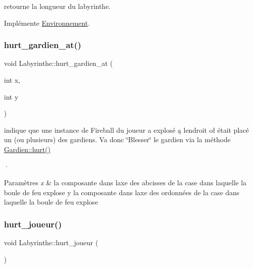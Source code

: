 retourne la longueur du labyrinthe. 



Implémente \hyperlink{classEnvironnement_af7629ab7f15ec65476eadcc80c46b50c}{Environnement}.

\mbox{\label{classLabyrinthe_a9c7c46b8c376f8b9ab0310ae1d0a369c}} 
\subsubsection{\texorpdfstring{hurt\+\_\+gardien\+\_\+at()}{hurt\_gardien\_at()}}
{\footnotesize\ttfamily void Labyrinthe\+::hurt\+\_\+gardien\+\_\+at (\begin{DoxyParamCaption}\item[{int}]{x,  }\item[{int}]{y }\end{DoxyParamCaption})}



indique que une instance de Fireball du joueur a explosé ą l\textquotesingle{}endroit oł était placé un (ou plusieurs) des gardiens. Va donc \char`\"{}\+Blesser\char`\"{} le gardien via la méthode \hyperlink{classGardien_ac4ba490e309de80c1449fc5baef90390}{Gardien\+::hurt()} 

·
\begin{DoxyParams}{Paramètres}
{\em x} & la composante dans l\textquotesingle{}axe des abcisses de la case dans laquelle la boule de feu explose  y la composante dans l\textquotesingle{}axe des ordonnées de la case dans laquelle la boule de feu explose \\
\hline
\end{DoxyParams}
\mbox{\label{classLabyrinthe_a28666f6cd5a5f32d41d664204a717593}} 
\subsubsection{\texorpdfstring{hurt\+\_\+joueur()}{hurt\_joueur()}}
{\footnotesize\ttfamily void Labyrinthe\+::hurt\+\_\+joueur (\begin{DoxyParamCaption}{ }\end{DoxyParamCaption})}



